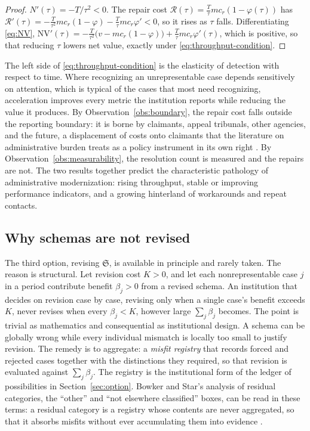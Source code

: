 \begin{proof}
$N'(\tau)=-T/\tau^2<0$. The repair cost $\mathcal{R}(\tau)=\frac{T}{\tau}mc_r(1-\varphi(\tau))$ has $\mathcal{R}'(\tau)=-\frac{T}{\tau^2}mc_r(1-\varphi)-\frac{T}{\tau}mc_r\varphi'<0$, so it rises as $\tau$ falls. Differentiating \eqref{eq:NV}, $\mathrm{NV}'(\tau)=-\frac{T}{\tau^2}\big(v-mc_r(1-\varphi)\big)+\frac{T}{\tau}mc_r\varphi'(\tau)$, which is positive, so that reducing $\tau$ lowers net value, exactly under \eqref{eq:throughput-condition}.
\end{proof}

The left side of \eqref{eq:throughput-condition} is the elasticity of detection with respect to time. Where recognizing an unrepresentable case depends sensitively on attention, which is typical of the cases that most need recognizing, acceleration improves every metric the institution reports while reducing the value it produces. By Observation~\ref{obs:boundary}, the repair cost falls outside the reporting boundary: it is borne by claimants, appeal tribunals, other agencies, and the future, a displacement of costs onto claimants that the literature on administrative burden treats as a policy instrument in its own right \cite{herdmoynihan2018}. By Observation~\ref{obs:measurability}, the resolution count is measured and the repairs are not. The two results together predict the characteristic pathology of administrative modernization: rising throughput, stable or improving performance indicators, and a growing hinterland of workarounds and repeat contacts.

\subsection{Why schemas are not revised}

The third option, revising $\mathfrak{S}$, is available in principle and rarely taken. The reason is structural. Let revision cost $K>0$, and let each nonrepresentable case $j$ in a period contribute benefit $\beta_j>0$ from a revised schema. An institution that decides on revision case by case, revising only when a single case's benefit exceeds $K$, never revises when every $\beta_j<K$, however large $\sum_j\beta_j$ becomes. The point is trivial as mathematics and consequential as institutional design. A schema can be globally wrong while every individual mismatch is locally too small to justify revision. The remedy is to aggregate: a \emph{misfit registry} that records forced and rejected cases together with the distinctions they required, so that revision is evaluated against $\sum_j\beta_j$. The registry is the institutional form of the ledger of possibilities in Section~\ref{sec:option}. Bowker and Star's analysis of residual categories, the ``other'' and ``not elsewhere classified'' boxes, can be read in these terms: a residual category is a registry whose contents are never aggregated, so that it absorbs misfits without ever accumulating them into evidence \cite{bowkerstar1999}.

